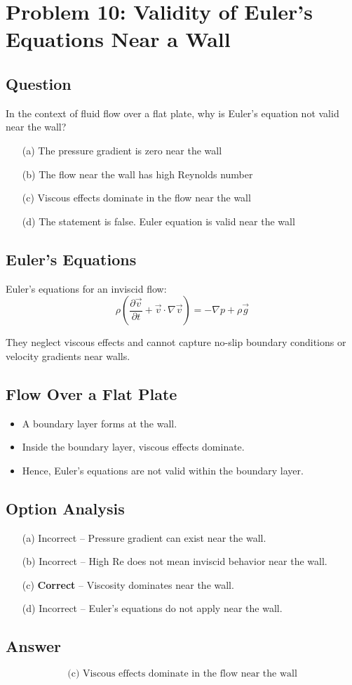 \documentclass{article}
\begin{document}
\section*{Problem 10: Validity of Euler’s Equations Near a Wall}

\subsection*{Question}
In the context of fluid flow over a flat plate, why is Euler’s equation not valid near the wall?

\begin{itemize}
  \item[(a)] The pressure gradient is zero near the wall
  \item[(b)] The flow near the wall has high Reynolds number
  \item[(c)] Viscous effects dominate in the flow near the wall
  \item[(d)] The statement is false. Euler equation is valid near the wall
\end{itemize}

\subsection*{Euler’s Equations}
Euler’s equations for an inviscid flow:
\[
\rho \left( \frac{\partial \vec{v}}{\partial t} + \vec{v} \cdot \nabla \vec{v} \right) = -\nabla p + \rho \vec{g}
\]

They neglect viscous effects and cannot capture no-slip boundary conditions or velocity gradients near walls.

\subsection*{Flow Over a Flat Plate}
\begin{itemize}
  \item A boundary layer forms at the wall.
  \item Inside the boundary layer, viscous effects dominate.
  \item Hence, Euler’s equations are not valid within the boundary layer.
\end{itemize}

\subsection*{Option Analysis}
\begin{itemize}
  \item[(a)] Incorrect – Pressure gradient can exist near the wall.
  \item[(b)] Incorrect – High Re does not mean inviscid behavior near the wall.
  \item[(c)] \textbf{Correct} – Viscosity dominates near the wall.
  \item[(d)] Incorrect – Euler’s equations do not apply near the wall.
\end{itemize}

\subsection*{Answer}
\[
\boxed{\text{(c) Viscous effects dominate in the flow near the wall}}
\]
\end{document}
